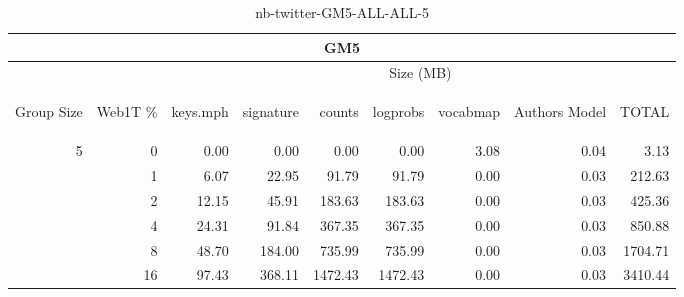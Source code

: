 \begin{center}
\begin{table}[htbp]
\begin{tabular}{ | r | r | r | r | r | r | r | r | r |}
\hline
\multicolumn{9}{|c|}{GM5}\\
\hline
 & & \multicolumn{7}{|c|}{Size (MB)}\\ \cline{3-9}
\begin{sideways}Group Size\end{sideways} & \begin{sideways}Web1T \% \end{sideways} & \begin{sideways}keys.mph\end{sideways} & \begin{sideways}signature\end{sideways} & \begin{sideways}counts\end{sideways} & \begin{sideways}logprobs\end{sideways} & \begin{sideways}vocabmap\end{sideways} & \begin{sideways}Authors Model \end{sideways} & \begin{sideways}TOTAL\end{sideways}\\
\hline
\multirow{5}{*}{5}
 & 0 & 0.00 & 0.00 & 0.00 & 0.00 & 3.08 & 0.04 & 3.13\\ \cline{2-9}
 & 1 & 6.07 & 22.95 & 91.79 & 91.79 & 0.00 & 0.03 & 212.63\\ \cline{2-9}
 & 2 & 12.15 & 45.91 & 183.63 & 183.63 & 0.00 & 0.03 & 425.36\\ \cline{2-9}
 & 4 & 24.31 & 91.84 & 367.35 & 367.35 & 0.00 & 0.03 & 850.88\\ \cline{2-9}
 & 8 & 48.70 & 184.00 & 735.99 & 735.99 & 0.00 & 0.03 & 1704.71\\ \cline{2-9}
 & 16 & 97.43 & 368.11 & 1472.43 & 1472.43 & 0.00 & 0.03 & 3410.44\\ \cline{2-9}
\hline
\end{tabular}
\caption{nb-twitter-GM5-ALL-ALL-5}
\label{table:nb-twitter-GM5-ALL-ALL-5}
\end{table}
\end{center}

